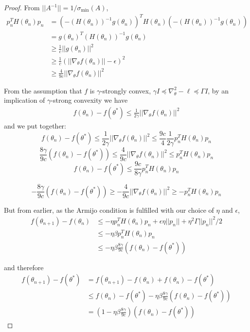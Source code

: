 \documentclass{article}
\begin{document}
\begin{proof}
From $||A^{-1}|| = 1/\sigma_{\min}(A)$,
\begin{align}
    p_n^TH(\theta_n)p_n &= (-(H(\theta_n))^{-1}g(\theta_n))^TH(\theta_n)(-(H(\theta_n))^{-1}g(\theta_n)) \\
    &= g(\theta_n)^T(H(\theta_n))^{-1}g(\theta_n) \\
    &\geq \frac{1}{c}||g(\theta_n)||^2 \\
    &\geq \frac{1}{c}(||\nabla_\theta f(\theta_n)|| - \epsilon)^2 \\
    &\geq \frac{4}{9c}||\nabla_\theta f(\theta_n)||^2
\end{align}

From the assumption that $f$ is $\gamma$-strongly convex, $\gamma I \preceq \nabla_\theta^2 -\ell \preceq \Gamma I$, by an implication of $\gamma$-strong convexity we have
\begin{align}
    f(\theta_n) - f(\theta^*) \leq \frac{1}{2\gamma}||\nabla_\theta f(\theta_n)||^2
\end{align}
and we put together:
\begin{equation}
    f(\theta_n) - f(\theta^*) \leq \frac{1}{2\gamma}||\nabla_\theta f(\theta_n)||^2 \leq \frac{9c}{4}\frac{1}{2\gamma}p_n^TH(\theta_n)p_n
\end{equation}
\begin{equation}
    \frac{8\gamma}{9c}(f(\theta_n) - f(\theta^*)) \leq \frac{4}{9c}||\nabla_\theta f(\theta_n)||^2 \leq p_n^TH(\theta_n)p_n
\end{equation}
\begin{equation}
    f(\theta_n) - f(\theta^*) \leq \frac{9c}{8\gamma}p_n^TH(\theta_n)p_n
\end{equation}


\begin{equation}
    -\frac{8\gamma}{9c}(f(\theta_n) - f(\theta^*)) \geq -\frac{4}{9c}||\nabla_\theta f(\theta_n)||^2 \geq -p_n^TH(\theta_n)p_n
\end{equation}

But from earlier, as the Armijo condition is fulfilled with our choice of $\eta$ and $\epsilon$,
\begin{align}
    f(\theta_{n+1})-f(\theta_n) &\leq -\eta p_n^TH(\theta_n)p_n + \epsilon\eta||p_n|| + \eta^2 \Gamma ||p_n||^2 / 2 \\
    &\leq -\eta\beta p_n^TH(\theta_n)p_n \\
    &\leq -\eta\beta\frac{8\gamma}{9c}(f(\theta_n) - f(\theta^*)) 
\end{align}

and therefore
\begin{align}
    f(\theta_{n+1}) - f(\theta^*) 
    &= f(\theta_{n+1})-f(\theta_n)+f(\theta_n)- f(\theta^*) \\
    &\leq f(\theta_n)- f(\theta^*) -\eta\beta\frac{8\gamma}{9c}(f(\theta_n) - f(\theta^*)) \\
    &= (1-\eta\beta\frac{8\gamma}{9c})(f(\theta_n) - f(\theta^*)) 
\end{align}

\end{proof}
\end{document}
